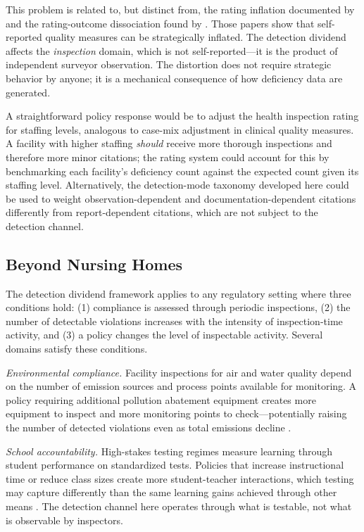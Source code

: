 \documentclass[12pt]{article}
\begin{document}
This problem is related to, but distinct from, the rating inflation documented by \citet{han2018} and the rating-outcome dissociation found by \citet{ryskina2018}. Those papers show that self-reported quality measures can be strategically inflated. The detection dividend affects the \textit{inspection} domain, which is not self-reported---it is the product of independent surveyor observation. The distortion does not require strategic behavior by anyone; it is a mechanical consequence of how deficiency data are generated.

A straightforward policy response would be to adjust the health inspection rating for staffing levels, analogous to case-mix adjustment in clinical quality measures. A facility with higher staffing \textit{should} receive more thorough inspections and therefore more minor citations; the rating system could account for this by benchmarking each facility's deficiency count against the expected count given its staffing level. Alternatively, the detection-mode taxonomy developed here could be used to weight observation-dependent and documentation-dependent citations differently from report-dependent citations, which are not subject to the detection channel.

\subsection{Beyond Nursing Homes}

The detection dividend framework applies to any regulatory setting where three conditions hold: (1) compliance is assessed through periodic inspections, (2) the number of detectable violations increases with the intensity of inspection-time activity, and (3) a policy changes the level of inspectable activity. Several domains satisfy these conditions.

\textit{Environmental compliance.} Facility inspections for air and water quality depend on the number of emission sources and process points available for monitoring. A policy requiring additional pollution abatement equipment creates more equipment to inspect and more monitoring points to check---potentially raising the number of detected violations even as total emissions decline \citep{shimshack2005, gray2011}.

\textit{School accountability.} High-stakes testing regimes measure learning through student performance on standardized tests. Policies that increase instructional time or reduce class sizes create more student-teacher interactions, which testing may capture differently than the same learning gains achieved through other means \citep{jacob2005, neal2010}. The detection channel here operates through what is testable, not what is observable by inspectors.
\end{document}
